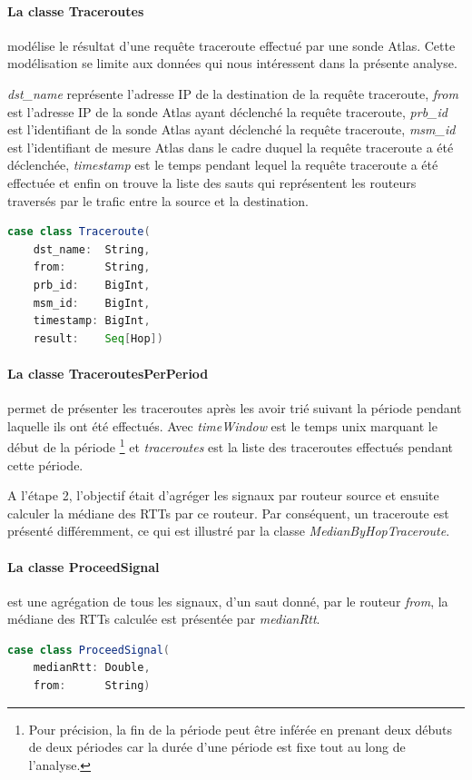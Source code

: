 \paragraph{La classe Traceroutes} modélise le résultat d'une requête traceroute effectué par une sonde Atlas. Cette modélisation se limite aux données qui nous intéressent dans la présente analyse. 

\textit{dst\_name} représente l'adresse IP de la destination de la requête traceroute, \textit{from} est l'adresse IP de la sonde Atlas ayant déclenché la requête traceroute, \textit{prb\_id} est l'identifiant de la sonde Atlas ayant déclenché la requête traceroute, \textit{msm\_id} est l'identifiant de mesure Atlas dans le cadre duquel la requête traceroute a été déclenchée, \textit{timestamp} est le temps pendant lequel la requête traceroute a été effectuée et enfin on trouve la liste des sauts qui représentent les routeurs traversés par le trafic entre la source et la destination. 

 \begin{lstlisting}[language=scala]
case class Traceroute(
	dst_name:  String,
	from:      String,
	prb_id:    BigInt,
	msm_id:    BigInt,
	timestamp: BigInt,
	result:    Seq[Hop])
 \end{lstlisting}
\paragraph{La classe TraceroutesPerPeriod} permet de présenter les traceroutes après les avoir trié   suivant la période pendant laquelle ils ont été effectués.  Avec \textit{timeWindow} est le temps unix marquant le début de la période \footnote{Pour précision, la fin de la période peut être inférée en prenant deux débuts de deux périodes car la durée d'une période est fixe tout au long de l'analyse.} et  \textit{traceroutes} est la liste des traceroutes effectués pendant cette période. 


A l'étape 2, l'objectif était d'agréger  les signaux par routeur source et ensuite calculer la médiane des RTTs par ce routeur. Par conséquent, un traceroute est présenté différemment, ce qui est  illustré par la classe \textit{MedianByHopTraceroute}.

\paragraph{La classe ProceedSignal }  est une agrégation de tous les signaux, d'un saut donné, par le routeur \textit{from},  la médiane des RTTs calculée est présentée par \textit{medianRtt}.
\begin{lstlisting}[language=scala]
case class ProceedSignal(
	medianRtt: Double,
	from:      String)
\end{lstlisting}
